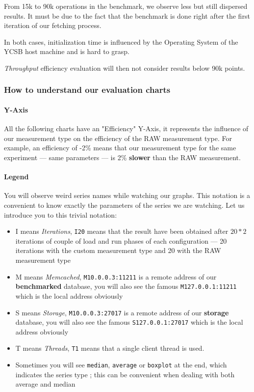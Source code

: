 \documentclass[a4paper,11pt]{report}
\begin{document}
From 15k to 90k operations in the benchmark, we observe less but still dispersed results. It must be due to the fact that the benchmark is done right after the first iteration of our fetching process.

In both cases, initialization time is influenced by the Operating System of the YCSB host machine and is hard to grasp.

\textit{Throughput} efficiency evaluation will then not consider results below 90k points.

\subsubsection{How to understand our evaluation charts}

\paragraph{Y-Axis}

All the following charts have an "Efficiency" Y-Axis, it represents the influence of our measurement type on the efficiency of the RAW measurement type. For example, an efficiency of -2\% means that our measurement type for the same experiment --- same parameters --- is 2\% \textbf{slower} than the RAW measurement.

\paragraph{Legend} You will observe weird series names while watching our graphs. This notation is a convenient to know exactly the parameters of the series we are watching. Let us introduce you to this trivial notation:

\begin{itemize}
\item
I means \textit{Iterations}, \texttt{I20} means that the result have been obtained after $20*2$ iterations of couple of load and run phases of each configuration --- 20 iterations with the custom measurement type and 20 with the RAW measurement type
\item
M means \textit{Memcached}, \texttt{M10.0.0.3:11211} is a remote address of our \textbf{benchmarked} database, you will also see the famous \texttt{M127.0.0.1:11211} which is the local address obviously
\item
S means \textit{Storage}, \texttt{M10.0.0.3:27017} is a remote address of our \textbf{storage} database, you will also see the famous \texttt{S127.0.0.1:27017} which is the local address obviously
\item
T means \textit{Threads}, \texttt{T1} means that a single client thread is used.
\item
Sometimes you will see \texttt{median}, \texttt{average} or \texttt{boxplot} at the end, which indicates the series type ; this can be convenient when dealing with both average and median
\end{itemize}
\end{document}
